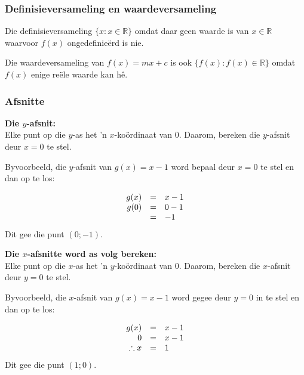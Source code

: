 \subsubsection*{Definisieversameling en waardeversameling}
\nopagebreak
Die definisieversameling $\{x:x\in \mathbb{R}\}$ omdat daar geen waarde is van  $x\in \mathbb{R}$ waarvoor $f(x)$ ongedefinieërd is nie.\par 
Die waardeversameling van $f(x)=mx+c$ is ook $\{f(x):f(x)\in \mathbb{R}\}$ omdat $f(x)$ enige re\"ele waarde kan h\^e.\par 
\par 

\subsubsection*{Afsnitte}
\textbf{Die $y$-afsnit:}\\
Elke punt op die $y$-as het 'n $x$-ko\"ordinaat van $0$. Daarom, bereken die $y$-afsnit deur $x=0$ te stel.\par
Byvoorbeeld, die $y$-afsnit van $g(x)=x-1$ word bepaal deur $x=0$ te stel en dan op te los:\par 

\begin{equation*}
\begin{array}{ccl}\hfill g(x)& =& x-1\hfill \\
\hfill g(0) &=& 0-1\hfill \\
& =& -1\hfill 
\end{array}
\end{equation*}
Dit gee die punt $(0;-1)$.\par

\textbf{Die $x$-afsnitte word as volg bereken:}\\
Elke punt op die $x$-as het 'n $y$-ko\"ordinaat van $0$. Daarom, bereken die $x$-afsnit deur $y=0$ te stel. \par
Byvoorbeeld, die $x$-afsnit van $g(x)=x-1$ word gegee deur $y=0$ in te stel en dan op te los:\par 

\begin{equation*}
\begin{array}{ccl}\hfill g(x)& =& x-1\hfill \\
\hfill 0& =& x-1\hfill \\
\hfill \therefore x& =& 1\hfill 
\end{array}
\end{equation*}
Dit gee die punt $(1;0)$.


